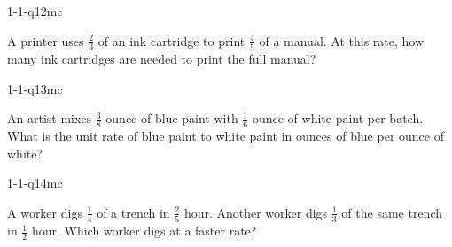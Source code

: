 \begin{practiceQuestion}{1-1-q12}{mc}
\begin{questionText}
A printer uses $\frac{2}{3}$ of an ink cartridge to print $\frac{4}{5}$ of a manual. At this rate, how many ink cartridges are needed to print the full manual?
\end{questionText}
\end{practiceQuestion}

\begin{practiceQuestion}{1-1-q13}{mc}
\begin{questionText}
An artist mixes $\frac{3}{8}$ ounce of blue paint with $\frac{1}{6}$ ounce of white paint per batch. What is the unit rate of blue paint to white paint in ounces of blue per ounce of white?
\end{questionText}
\end{practiceQuestion}

\begin{practiceQuestion}{1-1-q14}{mc}
\begin{questionText}
A worker digs $\frac{1}{4}$ of a trench in $\frac{2}{5}$ hour. Another worker digs $\frac{1}{3}$ of the same trench in $\frac{1}{2}$ hour. Which worker digs at a faster rate?
\end{questionText}
\end{practiceQuestion}

